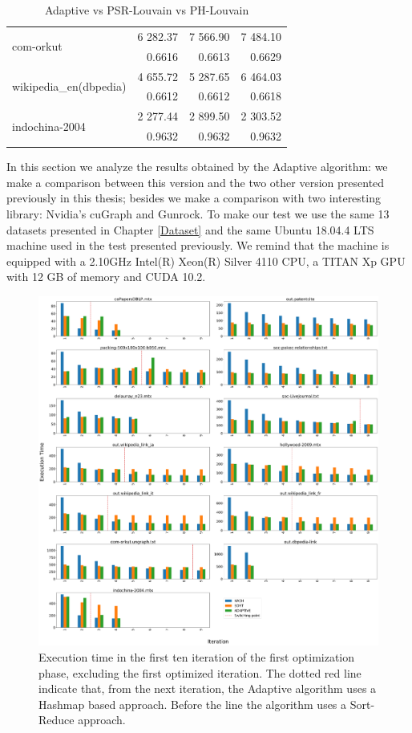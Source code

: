 \begin{table}[h]
\begin{tabular}{ |l||r||r|r|}
		\multirow{ 2}{*}{com-orkut }				& 6 282.37	& 7 566.90 	& 7 484.10 \\
													& 0.6616	& 0.6613 	& 0.6629 \\\hline
		\multirow{ 2}{*}{wikipedia\_en(dbpedia)}	& 4 655.72	& 5 287.65 	& 6 464.03 \\
													& 0.6612 	& 0.6612 	& 0.6618 \\\hline
		\multirow{ 2}{*}{indochina-2004}			& 2 277.44 	& 2 899.50 	& 2 303.52 \\
													& 0.9632	& 0.9632 	& 0.9632 \\\hline
	\end{tabular}
	\caption{\label{tab:adaptive} Adaptive vs PSR-Louvain vs PH-Louvain}
\end{table} 
\newpage
\noindent In this section we analyze the results obtained by the Adaptive algorithm: we make a comparison between this version and the two other version presented previously in this thesis; besides we make a comparison with two interesting library: Nvidia's cuGraph and Gunrock.
To make our test we use the same 13 datasets presented in Chapter \ref{Dataset} and the same Ubuntu 18.04.4 LTS machine used in the test presented previously. We remind that the machine is equipped with a 2.10GHz Intel(R) Xeon(R) Silver 4110 CPU, a TITAN Xp GPU with 12 GB of memory and CUDA 10.2.
\begin{figure}[t!]
	\centering
	\includegraphics[width=1\linewidth]{0-resources/adaptive-vs-other}
	\caption{Execution time in the first ten iteration of the first optimization phase, excluding the first optimized iteration. The dotted red line indicate that, from the next iteration, the Adaptive algorithm uses a Hashmap based approach. Before the line the algorithm uses a Sort-Reduce approach.}
	\label{fig:adaptive-vs-other}
\end{figure}
